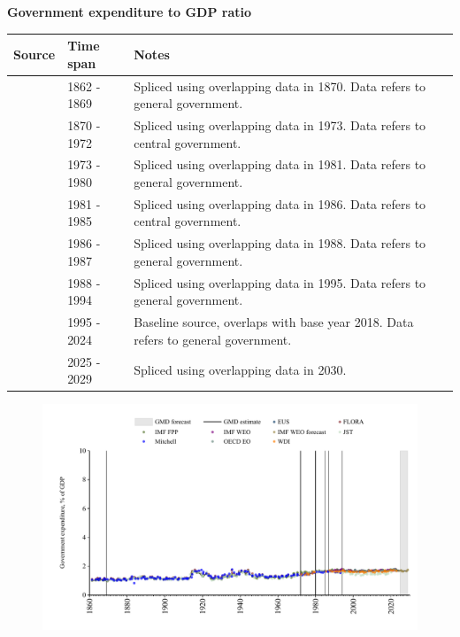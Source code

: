 \documentclass[12pt,a4paper,landscape]{article}
\begin{document}
\begin{adjustbox}{max totalsize={\paperwidth}{\paperheight},center}
\begin{minipage}[t][\textheight][t]{\textwidth}
\vspace*{0.5cm}
{}
\begin{center}
{\Large\bfseries Government expenditure to GDP ratio}
\end{center}
\vspace{0.5cm}
\begin{table}[H]
\centering
\small
\begin{tabular}{|l|l|l|}
\hline
\textbf{Source} & \textbf{Time span} & \textbf{Notes} \\
\hline
\rowcolor{white}\cite{IMF_FPP}& 1862 - 1869 &Spliced using overlapping data in 1870. Data refers to general government.\\
\rowcolor{lightgray}\cite{JST}& 1870 - 1972 &Spliced using overlapping data in 1973. Data refers to central government.\\
\rowcolor{white}\cite{WDI}& 1973 - 1980 &Spliced using overlapping data in 1981. Data refers to general government.\\
\rowcolor{lightgray}\cite{JST}& 1981 - 1985 &Spliced using overlapping data in 1986. Data refers to central government.\\
\rowcolor{white}\cite{WDI}& 1986 - 1987 &Spliced using overlapping data in 1988. Data refers to general government.\\
\rowcolor{lightgray}\cite{IMF_WEO}& 1988 - 1994 &Spliced using overlapping data in 1995. Data refers to general government.\\
\rowcolor{white}\cite{EUS}& 1995 - 2024 &Baseline source, overlaps with base year 2018. Data refers to general government.\\
\rowcolor{lightgray}\cite{IMF_WEO_forecast}& 2025 - 2029 &Spliced using overlapping data in 2030. \\
\hline
\end{tabular}
\end{table}
\begin{figure}[H]
\centering
\includegraphics[width=\textwidth,height=0.6\textheight,keepaspectratio]{graphs/ITA_govexp_GDP.pdf}
\end{figure}
\end{minipage}
\end{adjustbox}
\end{document}
